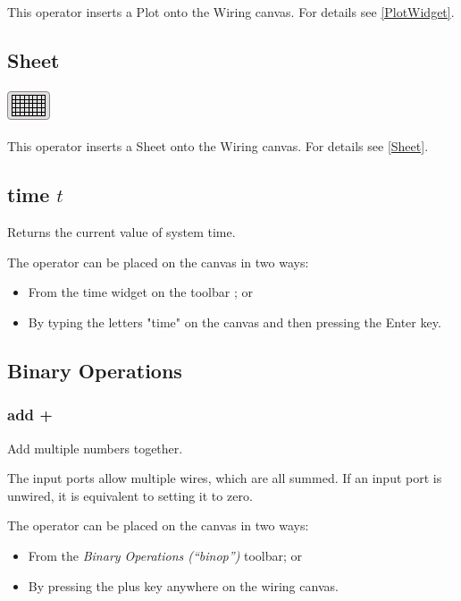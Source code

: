 This operator inserts a Plot onto the Wiring canvas. For details see
\ref{PlotWidget}.

\subsection{Sheet}
\begin{center}
  \includegraphics{images/sheet}
\end{center}

This operator inserts a Sheet onto the Wiring canvas. For details
see \ref{Sheet}.

\subsection{time $t$}

\label{Operation:time} Returns the current value of system time.

The operator can be placed on the canvas in two ways:
\begin{itemize}
\item From the time widget on the toolbar ;
or 
\item By typing the letters "time" on the canvas and then pressing the
Enter key.
\end{itemize}

\subsection{Binary Operations}

\label{Binary-Operations}

\subsubsection{add +}


\label{Operation:add} Add multiple numbers together.

The input ports allow multiple wires, which are all summed. If an
input port is unwired, it is equivalent to setting it to zero.

The operator can be placed on the canvas in two ways:
\begin{itemize}
\item From the \emph{Binary Operations (``binop'') }toolbar; or 
\item By pressing the plus key anywhere on the wiring canvas. 
\end{itemize}


